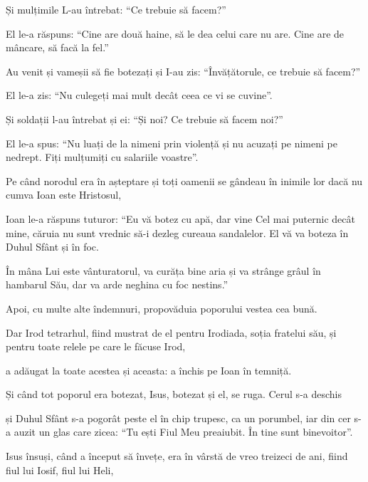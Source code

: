 {\par }{\PP {}Și mulțimile L-au întrebat: “Ce trebuie să facem?”


\par }{\PP {}El le-a răspuns: “Cine are două haine, să le dea celui care nu are. Cine are de mâncare, să facă la fel.”


\par }{\PP {}Au venit și vameșii să fie botezați și I-au zis: “Învățătorule, ce trebuie să facem?”


\par }{\PP {}El le-a zis: “Nu culegeți mai mult decât ceea ce vi se cuvine”.


\par }{\PP {}Și soldații l-au întrebat și ei: “Și noi? Ce trebuie să facem noi?”

\par }{\PP El le-a spus: “Nu luați de la nimeni prin violență și nu acuzați pe nimeni pe nedrept. Fiți mulțumiți cu salariile voastre”.


\par }{\PP {}Pe când norodul era în așteptare și toți oamenii se gândeau în inimile lor dacă nu cumva Ioan este Hristosul,

Ioan le-a răspuns tuturor: “Eu vă botez cu apă, dar vine Cel mai puternic decât mine, căruia nu sunt vrednic să-i dezleg cureaua sandalelor. El vă va boteza în Duhul Sfânt și în foc.

În mâna Lui este vânturatorul, va curăța bine aria și va strânge grâul în hambarul Său, dar va arde neghina cu foc nestins.”


\par }{\PP {}Apoi, cu multe alte îndemnuri, propovăduia poporului vestea cea bună.

Dar Irod tetrarhul, fiind mustrat de el pentru Irodiada, soția fratelui său, și pentru toate relele pe care le făcuse Irod,

a adăugat la toate acestea și aceasta: a închis pe Ioan în temniță.


\par }{\PP {}Și când tot poporul era botezat, Isus, botezat și el, se ruga. Cerul s-a deschis

și Duhul Sfânt s-a pogorât peste el în chip trupesc, ca un porumbel, iar din cer s-a auzit un glas care zicea: “Tu ești Fiul Meu preaiubit. În tine sunt binevoitor”.


\par }{\PP {}Isus însuși, când a început să învețe, era în vârstă de vreo treizeci de ani, fiind fiul lui Iosif, fiul lui Heli,

}
